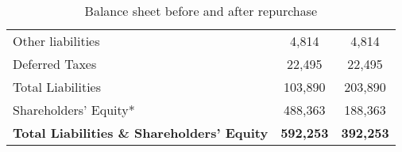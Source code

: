 \begin{table}[ht]
\begin{tabular}{lcc}
Other liabilities                             & 4,814            & 4,814            \\
Deferred Taxes                                & 22,495           & 22,495           \\
Total Liabilities                             & 103,890          & 203,890          \\
Shareholders' Equity*                         & 488,363          & 188,363          \\
\textbf{Total Liabilities \& Shareholders' Equity}     & \textbf{592,253}    & \textbf{392,253} \\ \bottomrule
\end{tabular}
\caption{Balance sheet before and after repurchase}
\label{tab:q4-bs}
\end{table}
